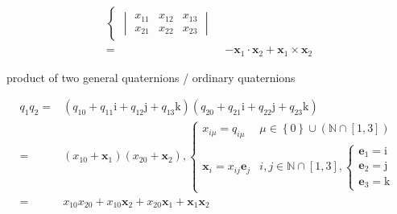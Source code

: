 \documentclass[
]{book}
\theoremstyle{definition}
\theoremstyle{definition}
\theoremstyle{definition}
\theoremstyle{definition}
\theoremstyle{remark}
\begin{document}
\[\begin{aligned}
\begin{cases}
\begin{vmatrix}
x_{{\scriptscriptstyle 1}{\scriptscriptstyle 1}} & x_{{\scriptscriptstyle 1}{\scriptscriptstyle 2}} & x_{{\scriptscriptstyle 1}{\scriptscriptstyle 3}}\\
x_{{\scriptscriptstyle 2}{\scriptscriptstyle 1}} & x_{{\scriptscriptstyle 2}{\scriptscriptstyle 2}} & x_{{\scriptscriptstyle 2}{\scriptscriptstyle 3}}
\end{vmatrix}
\end{cases}\\
= & -\boldsymbol{x}_{{\scriptscriptstyle 1}}\cdot\boldsymbol{x}_{{\scriptscriptstyle 2}}+\boldsymbol{x}_{{\scriptscriptstyle 1}}\times\boldsymbol{x}_{{\scriptscriptstyle 2}}
\end{aligned}
\]

product of two general quaternions / ordinary quaternions

\[
\begin{aligned}
q_{{\scriptscriptstyle 1}}q_{{\scriptscriptstyle 2}}= & \left(q_{{\scriptscriptstyle 10}}+q_{{\scriptscriptstyle 11}}\mathrm{i}+q_{{\scriptscriptstyle 12}}\mathrm{j}+q_{{\scriptscriptstyle 13}}\mathrm{k}\right)\left(q_{{\scriptscriptstyle 20}}+q_{{\scriptscriptstyle 21}}\mathrm{i}+q_{{\scriptscriptstyle 22}}\mathrm{j}+q_{{\scriptscriptstyle 23}}\mathrm{k}\right)\\
= & \left(x_{{\scriptscriptstyle 10}}+\boldsymbol{x}_{{\scriptscriptstyle 1}}\right)\left(x_{{\scriptscriptstyle 20}}+\boldsymbol{x}_{{\scriptscriptstyle 2}}\right),\begin{cases}
x_{{\scriptscriptstyle i\mu}}=q_{{\scriptscriptstyle i\mu}} & \mu\in\left\{ 0\right\} \cup\left(\mathbb{N}\cap\left[1,3\right]\right)\\
\boldsymbol{x}_{{\scriptscriptstyle i}}=x_{{\scriptscriptstyle ij}}\boldsymbol{e}_{{\scriptscriptstyle j}} & i,j\in\mathbb{N}\cap\left[1,3\right],\begin{cases}
\boldsymbol{e}_{{\scriptscriptstyle 1}}=\mathrm{i}\\
\boldsymbol{e}_{{\scriptscriptstyle 2}}=\mathrm{j}\\
\boldsymbol{e}_{{\scriptscriptstyle 3}}=\mathrm{k}
\end{cases}
\end{cases}\\
= & x_{{\scriptscriptstyle 10}}x_{{\scriptscriptstyle 20}}+x_{{\scriptscriptstyle 10}}\boldsymbol{x}_{{\scriptscriptstyle 2}}+x_{{\scriptscriptstyle 20}}\boldsymbol{x}_{{\scriptscriptstyle 1}}+\boldsymbol{x}_{{\scriptscriptstyle 1}}\boldsymbol{x}_{{\scriptscriptstyle 2}}\\

\end{aligned}\]
\end{document}
